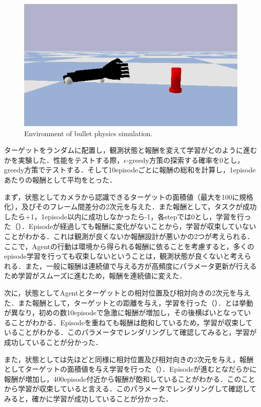 \begin{figure}
    \centering
    \includegraphics[width=0.7\linewidth]{figure/chapter3/bullet_demo}
    \caption{Environment of bullet physics simulation.}
    \label{fig:1号機simu}
\end{figure}


ターゲットをランダムに配置し，観測状態と報酬を変えて学習がどのように進むかを実験した．性能をテストする際，$\epsilon$-greedy方策の探索する確率を0とし，greedy方策でテストする．そして10episodeごとに報酬の総和を計算し，1episodeあたりの報酬として平均をとった．

まず，状態としてカメラから認識できるターゲットの面積値（最大を100に規格化），及びそのフレーム間差分の2次元を与えた．また報酬として，タスクが成功したら+1，1episode以内に成功しなかったら-1，各stepでは0とし，学習を行った（）．Episodeが経過しても報酬に変化がないことから，学習が収束していないことがわかる．これは観測が良くないか報酬設計が悪いかの2つが考えられる．ここで，Agentの行動は環境から得られる報酬に依ることを考慮すると，多くのepisode学習を行っても収束しないということは，観測状態が良くないと考えられる．また，一般に報酬は連続値で与える方が高頻度にパラメータ更新が行えるため学習がスムーズに進むため，報酬を連続値に変えた．

次に，状態としてAgentとターゲットとの相対位置及び相対向きの2次元を与えた．また報酬として，ターゲットとの距離を与え，学習を行った（）．とは挙動が異なり，初めの数10episodeで急激に報酬が増加し，その後横ばいとなっていることがわかる．Episodeを重ねても報酬は飽和しているため，学習が収束していることがわかる．このパラメータでレンダリングして確認してみると，学習が成功していることが分かった．

また，状態としては先ほどと同様に相対位置及び相対向きの2次元を与え，報酬としてターゲットの面積値を与え学習を行った（）．Episodeが進むとなだらかに報酬が増加し，400episode付近から報酬が飽和していることがわかる．このことから学習が収束していると言える．このパラメータでレンダリングして確認してみると，確かに学習が成功していることが分かった．

